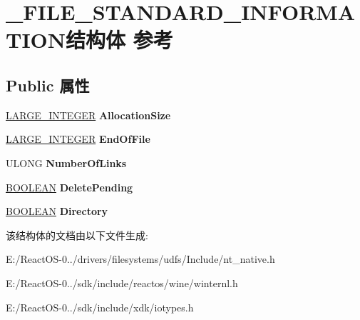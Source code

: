 \hypertarget{struct___f_i_l_e___s_t_a_n_d_a_r_d___i_n_f_o_r_m_a_t_i_o_n}{}\section{\+\_\+\+F\+I\+L\+E\+\_\+\+S\+T\+A\+N\+D\+A\+R\+D\+\_\+\+I\+N\+F\+O\+R\+M\+A\+T\+I\+O\+N结构体 参考}
\label{struct___f_i_l_e___s_t_a_n_d_a_r_d___i_n_f_o_r_m_a_t_i_o_n}
\subsection*{Public 属性}
\begin{DoxyCompactItemize}
\item 
\mbox{\label{struct___f_i_l_e___s_t_a_n_d_a_r_d___i_n_f_o_r_m_a_t_i_o_n_ab58b2940f1fbe9e33c3b3670836d5856}} 
\hyperlink{union___l_a_r_g_e___i_n_t_e_g_e_r}{L\+A\+R\+G\+E\+\_\+\+I\+N\+T\+E\+G\+ER} {\bfseries Allocation\+Size}
\item 
\mbox{\label{struct___f_i_l_e___s_t_a_n_d_a_r_d___i_n_f_o_r_m_a_t_i_o_n_a010ac9abd90b1824634120f3f579ac36}} 
\hyperlink{union___l_a_r_g_e___i_n_t_e_g_e_r}{L\+A\+R\+G\+E\+\_\+\+I\+N\+T\+E\+G\+ER} {\bfseries End\+Of\+File}
\item 
\mbox{\label{struct___f_i_l_e___s_t_a_n_d_a_r_d___i_n_f_o_r_m_a_t_i_o_n_a0ce5ea8999eaf912ea04aa43d8df282c}} 
U\+L\+O\+NG {\bfseries Number\+Of\+Links}
\item 
\mbox{\label{struct___f_i_l_e___s_t_a_n_d_a_r_d___i_n_f_o_r_m_a_t_i_o_n_aef758f8ad04b58ad5b18174089266e72}} 
\hyperlink{_processor_bind_8h_a112e3146cb38b6ee95e64d85842e380a}{B\+O\+O\+L\+E\+AN} {\bfseries Delete\+Pending}
\item 
\mbox{\label{struct___f_i_l_e___s_t_a_n_d_a_r_d___i_n_f_o_r_m_a_t_i_o_n_ab52a5485a0ad3a7914a299eca29a79ed}} 
\hyperlink{_processor_bind_8h_a112e3146cb38b6ee95e64d85842e380a}{B\+O\+O\+L\+E\+AN} {\bfseries Directory}
\end{DoxyCompactItemize}


该结构体的文档由以下文件生成\+:\begin{DoxyCompactItemize}
\item 
E\+:/\+React\+O\+S-\/0../drivers/filesystems/udfs/\+Include/nt\+\_\+native.\+h\item 
E\+:/\+React\+O\+S-\/0../sdk/include/reactos/wine/winternl.\+h\item 
E\+:/\+React\+O\+S-\/0../sdk/include/xdk/iotypes.\+h\end{DoxyCompactItemize}
